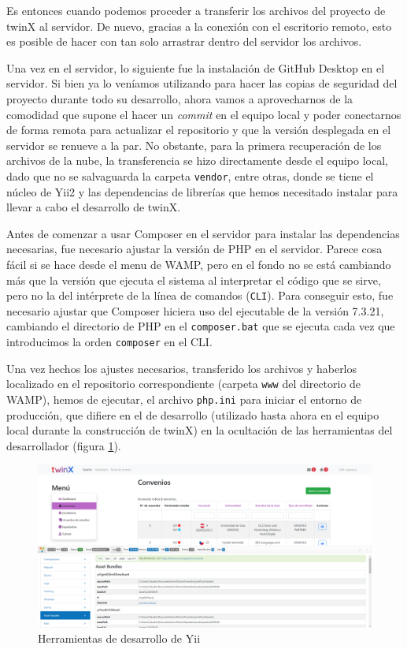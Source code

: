 Es entonces cuando podemos proceder a transferir los archivos del proyecto de twinX al servidor. De nuevo, gracias a la conexión con el escritorio remoto, esto es posible de hacer con tan solo arrastrar dentro del servidor los archivos. 

Una vez en el servidor, lo siguiente fue la instalación de GitHub Desktop \cite{githubdesktop} en el servidor. Si bien ya lo veníamos utilizando para hacer las copias de seguridad del proyecto durante todo su desarrollo, ahora vamos a aprovecharnos de la comodidad que supone el hacer un \textit{commit} en el equipo local y poder conectarnos de forma remota para actualizar el repositorio y que la versión desplegada en el servidor se renueve a la par. No obstante, para la primera recuperación de los archivos de la nube, la transferencia se hizo directamente desde el equipo local, dado que no se salvaguarda la carpeta \texttt{vendor}, entre otras, donde se tiene el núcleo de Yii2 y las dependencias de librerías que hemos necesitado instalar para llevar a cabo el desarrollo de twinX.

Antes de comenzar a usar Composer en el servidor para instalar las dependencias necesarias, fue necesario ajustar la versión de PHP en el servidor. Parece cosa fácil si se hace desde el menu de WAMP, pero en el fondo no se está cambiando más que la versión que ejecuta el sistema al interpretar el código que se sirve, pero no la del intérprete de la línea de comandos (\texttt{CLI}). Para conseguir esto, fue necesario ajustar que Composer hiciera uso del ejecutable de la versión 7.3.21, cambiando el directorio de PHP en el \texttt{composer.bat} que se ejecuta cada vez que introducimos la orden \texttt{composer} en el CLI.

Una vez hechos los ajustes necesarios, transferido los archivos y haberlos localizado en el repositorio correspondiente (carpeta \texttt{www} del directorio de WAMP), hemos de ejecutar, el archivo \texttt{php.ini} para iniciar el entorno de producción, que difiere en el de desarrollo (utilizado hasta ahora en el equipo local durante la construcción de twinX) en la ocultación de las herramientas del desarrollador (figura \ref{fig:herramientasdesarrollo}).

\begin{figure}
	\centering
	\includegraphics{img/herramientas_desarrollo}
	\caption{Herramientas de desarrollo de Yii}
	\label{fig:herramientasdesarrollo}
\end{figure}


